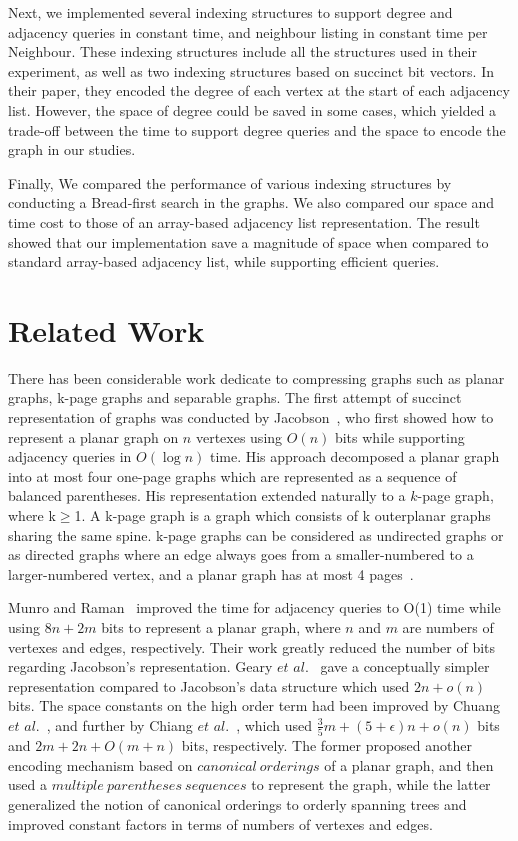 \documentclass[12pt,glossary]{dalthesis}
\begin{document}
\bigskip
\bigskip

Next, we implemented several indexing structures to support degree and adjacency queries in constant time, and neighbour listing in constant time per Neighbour. These indexing structures include all the structures used in their experiment, as well as two indexing structures based on succinct bit vectors. In their paper, they encoded the degree of each vertex at the start of each adjacency list. However, the space of degree could be saved in some cases, which yielded a trade-off between the time to support degree queries and the space to encode the graph in our studies.

\bigskip
\bigskip

Finally, We compared the performance of various indexing structures by conducting a Bread-first search in the graphs. We also compared our space and time cost to those of an array-based adjacency list representation. The result showed that our implementation save a magnitude of space when compared to standard array-based adjacency list, while supporting efficient queries.   

\section{Related Work}

There has been considerable work dedicate to compressing graphs such as planar graphs, k-page graphs and separable graphs. The first attempt of succinct representation of graphs was conducted by Jacobson~\cite{Jacobson}, who first showed how to represent a planar graph on $n$ vertexes using $O(n)$ bits while supporting adjacency queries in $O(\log n)$ time. His approach decomposed a planar graph into at most four one-page graphs which are represented as a sequence of balanced parentheses. His representation extended naturally to a $k$-page graph, where k$\geq$1. A k-page graph is a graph which consists of k outerplanar graphs sharing the same spine. k-page graphs can be considered as undirected graphs or as directed graphs where an edge always goes from a smaller-numbered to a larger-numbered vertex, and a planar graph has at most 4 pages~\cite{k-page-def}. 

\bigskip
\bigskip

Munro and Raman~\cite{Munro} improved the time for adjacency queries to O(1) time while using $8n+2m$ bits to represent a planar graph, where $n$ and $m$ are numbers of vertexes and edges, respectively. Their work greatly reduced the number of bits regarding Jacobson's representation. Geary $et$ $al.$~\cite{Geary} gave a conceptually simpler representation compared to Jacobson's data structure which used $2n+o(n)$ bits. The space constants on the high order term had been improved by Chuang $et$ $al.$~\cite{Chuang}, and further by Chiang $et$ $al.$~\cite{Chiang}, which used $\frac{3}{5} m + (5+ \epsilon )n + o(n)$ bits and  $2m+2n+O(m+n)$ bits, respectively. The former proposed another encoding mechanism based on $canonical \ orderings$ of a planar graph, and then used a $multiple \ parentheses \ sequences$ to represent the graph, while the latter generalized the notion of canonical orderings to orderly spanning trees and improved constant factors in terms of numbers of vertexes and edges. 
\end{document}
